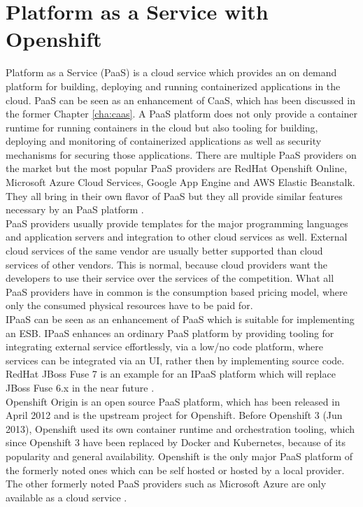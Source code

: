 \chapter{Platform as a Service with Openshift}
\label{cha:paas}
Platform as a Service (PaaS) is a cloud service which provides an on demand platform for building, deploying and running containerized applications in the cloud. PaaS can be seen as an enhancement of CaaS, which has been discussed in the former Chapter \vref{cha:caas}. A PaaS platform does not only provide a container runtime for running containers in the cloud but also tooling for building, deploying and monitoring of containerized applications as well as security mechanisms for securing those applications. There are multiple PaaS providers on the market but the most popular PaaS providers are RedHat Openshift Online, Microsoft Azure Cloud Services, Google App Engine and AWS Elastic Beanstalk. They all bring in their own flavor of PaaS but they all provide similar features necessary by an PaaS platform \cite{OpenshiftOnline2018, MicrosoftAzueCloudServices2018, GoogleCloudAE2018, AmazonWebServicesEBT2018}. \\

PaaS providers usually provide templates for the major programming languages and application servers and integration to other cloud services as well. External cloud services of the same vendor are usually better supported than cloud services of other vendors. This is normal, because cloud providers want the developers to use their service over the services of the competition. What all PaaS providers have in common is the consumption based pricing model, where only the consumed physical resources have to be paid for. \\ 

IPaaS can be seen as an enhancement of PaaS which is suitable for implementing an ESB. IPaaS enhances an ordinary PaaS platform by providing tooling for integrating external service effortlessly, via a low/no code platform, where services can be integrated via an UI, rather then by implementing source code. RedHat JBoss Fuse 7 is an example for an IPaaS platform which will replace JBoss Fuse 6.x in the near future \cite{Fuse72018, iPaaSP12015, iPaaSP22015}. \\

Openshift Origin is an open source PaaS platform, which has been released in April 2012 and is the upstream project for Openshift. Before Openshift 3 (Jun 2013), Openshift used its own container runtime and orchestration tooling, which since Openshift 3 have been replaced by Docker and Kubernetes, because of its popularity and general availability. Openshift is the only major PaaS platform of the formerly noted ones which can be self hosted or hosted by a local provider. The other formerly noted PaaS providers such as Microsoft Azure are only available as a cloud service \cite{OpenshiftOriginGithub2018}.

